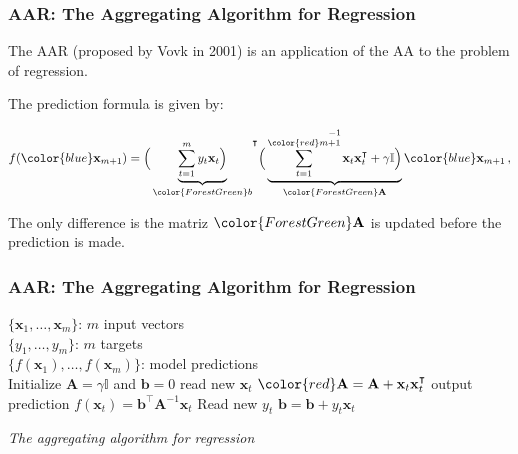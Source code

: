 \begin{frame}
     \frametitle{AAR: The Aggregating Algorithm for Regression}

    The {\color{red}AAR} (proposed by Vovk in 2001) is an application of
    the AA to the problem of regression.

    The prediction formula is given by:

    \begin{equation}
    f({\color{blue}\mathbf{x}_{m+1}}) =
    \displaystyle {\Big( \underbrace{\sum_{t=1}^m y_t \mathbf{x}_t \Big
    )}_{\color{ForestGreen}b}}^\intercal \Big ( \underbrace{\sum_{t=1}^{{\color{red}m+1}} \mathbf{x}_t \mathbf{x}_t
    ^\intercal + \gamma \mathbb{I} \Big
    )}_{\color{ForestGreen}\mathbf{A}}^{-1}
    {\color{blue}\mathbf{x}_{m+1}} \, ,
    \end{equation} 
   
    The only difference is the matriz $\color{ForestGreen}\mathbf{A}$ is updated before
    the prediction is made.
\end{frame}


\begin{frame}
     \frametitle{AAR: The Aggregating Algorithm for Regression}

    \begin{algorithm}[H] \begin{algorithmic}[1] \REQUIRE $\,$ \\
    $\{\mathbf{x}_1,\dots,\mathbf{x}_m \}$: $m$ input vectors \\
    $\{y_1,\dots,y_m \}$: $m$ targets \\ \ENSURE  $\,$ \\
    $\{f(\mathbf{x}_1),\dots,f(\mathbf{x}_m) \}$: model predictions \\
    \STATE Initialize $\mathbf{A}=\gamma \mathbb{I}$ and $\mathbf{b}=0$
     \STATE read new $\mathbf{x}_t$ \STATE
    $\color{red}\mathbf{A} = \mathbf{A} + \mathbf{x}_t \mathbf{x}_t^\intercal$ \STATE
    {\color{blue}output prediction $f(\mathbf{x}_t) =  \mathbf{b}^\intercal
    \mathbf{A}^{-1}\mathbf{x}_t$} 
    \STATE Read new $y_t$ \STATE $\mathbf{b}
    = \mathbf{b} + y_t \mathbf{x}_t$ \ENDFOR
    \end{algorithmic} \caption{{\em The aggregating algorithm for
    regression}} \label{alg:AAR} \end{algorithm}

\end{frame}


